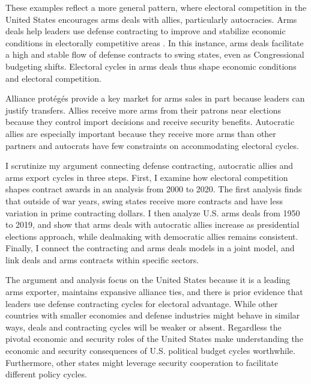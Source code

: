 \documentclass[12pt]{article}
\begin{document}
These examples reflect a more general pattern, where electoral competition in the United States encourages arms deals with allies, particularly autocracies.
Arms deals help leaders use defense contracting to improve and stabilize economic conditions in electorally competitive areas \citep{Tufte1978, Mintz1988, Mayer1995, DerouenHeo2000, Becker2021}. 
In this instance, arms deals facilitate a high and stable flow of defense contracts to swing states, even as Congressional budgeting shifts. 
Electoral cycles in arms deals thus shape economic conditions and electoral competition. 


Alliance prot{\'e}g{\'e}s provide a key market for arms sales in part because leaders can justify transfers. 
Allies receive more arms from their patrons near elections because they control import decisions and receive security benefits. 
Autocratic allies are especially important because they receive more arms than other partners \citep{McManusYarhi-Milo2017} and autocrats have few constraints on accommodating electoral cycles.


I scrutinize my argument connecting defense contracting, autocratic allies and arms export cycles in three steps. 
First, I examine how electoral competition shapes contract awards in an analysis from 2000 to 2020.
The first analysis finds that outside of war years, swing states receive more contracts and have less variation in prime contracting dollars. 
I then analyze U.S. arms deals from 1950 to 2019, and show that arms deals with autocratic allies increase as presidential elections approach, while dealmaking with democratic allies remains consistent. 
Finally, I connect the contracting and arms deals models in a joint model, and link deals and arms contracts within specific sectors.


The argument and analysis focus on the United States because it is a leading arms exporter, maintains expansive alliance ties, and there is prior evidence that leaders use defense contracting cycles for electoral advantage. 
While other countries with smaller economies and defense industries might behave in similar ways, deals and contracting cycles will be weaker or absent.
Regardless the pivotal economic and security roles of the United States make understanding the economic and security consequences of U.S. political budget cycles worthwhile.
Furthermore, other states might leverage security cooperation to facilitate different policy cycles. 
\end{document}
